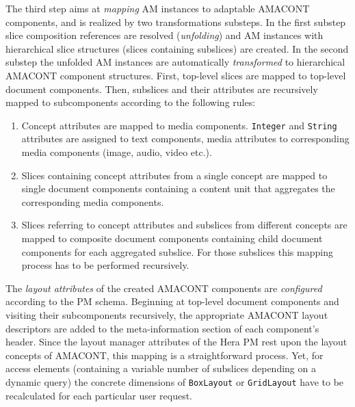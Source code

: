 \documentclass[oribibl]{llncs}
\begin{document}
The third step aims at \emph{mapping} AM instances to adaptable AMACONT components, and is
realized by two transformations substeps.
In the first substep slice composition references are resolved (\emph{unfolding}) and AM instances with hierarchical slice structures (slices containing subslices) are created.
In the second substep the unfolded AM instances are automatically \emph{transformed} to hierarchical AMACONT component structures.
First, top-level slices are mapped to top-level document components.
Then, subslices and their attributes are recursively mapped to subcomponents according to the following rules:

\begin{enumerate}
\item Concept attributes are mapped to media components. 
\texttt{Integer} and \texttt{String} attributes are assigned to text components, media attributes to corresponding media components (image, audio, video etc.).
\item Slices containing concept attributes from a single concept are mapped to single document components containing a content unit that aggregates the corresponding media components.
\item Slices referring to concept attributes and subslices from different concepts are mapped to composite document components containing child document components for each aggregated subslice.
For those subslices this mapping process has to be performed recursively.
\end{enumerate}

The \emph{layout attributes} of the created AMACONT components are \emph{configured} according to the PM schema.
Beginning at top-level document components and visiting their subcomponents recursively, 
the appropriate AMACONT layout descriptors are added to the meta-information section of each component's header.
Since the layout manager attributes of the Hera PM rest upon the layout concepts of AMACONT, this mapping is a straightforward process.
Yet, for access elements (containing a variable number of subslices depending on a dynamic query) the concrete dimensions of \texttt{BoxLayout} or \texttt{GridLayout} 
have to be recalculated for each particular user request.
\end{document}
